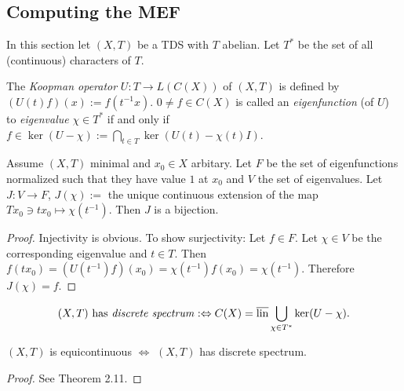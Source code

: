 \subsection{Computing the MEF}
In this section let $(X,T)$ be a TDS with $T$ abelian.
Let $T^*$ be the set of all (continuous) characters of $T$.
\begin{definition}
  The \emph{Koopman operator} $U : T \to L(C(X))$ of $(X,T)$ is defined by $(U(t) f)(x) := f(t^{-1}x)$.
  $0 \neq f \in C(X)$ is called an \emph{eigenfunction} (of $U$) to \emph{eigenvalue} $\chi \in T^*$ if and only if $f \in \ker (U-\chi):= \bigcap_{t \in T} \ker (U(t)- \chi (t)I)$.
\end{definition}
\begin{proposition}
  Assume $(X,T)$ minimal and $x_0 \in X$ arbitary. Let $F$ be the set of eigenfunctions normalized such that they have value $1$ at $x_0$ and $V$ the set of eigenvalues. Let $J: V \to F$, $J(\chi):=$ the unique continuous extension of the map $T x_0 \ni t x_0 \mapsto \chi(t^{-1})$. Then $J$ is a bijection.
\end{proposition}
\begin{proof}
  Injectivity is obvious.
  To show surjectivity:
  Let $f \in F$. Let $\chi \in V$ be the corresponding eigenvalue and $t \in T$. Then $ f(t x_0) = (U(t^{-1}) f)(x_0) = \chi(t^{-1}) f(x_0) = \chi (t^{-1})$. Therefore $J(\chi ) = f$.
\end{proof}
\begin{definition}
  \begin{equation*}
    (X,T) \ \text{has \emph{discrete spectrum}}:\Leftrightarrow C(X) = \overline{\operatorname{lin}} \bigcup_{\chi \in T^*} \ker (U- \chi).
  \end{equation*}
\end{definition}
\begin{theorem}
  \label{mef:thm:equiEQdiscrete}
  $(X,T)$ is equicontinuous $\Leftrightarrow$ $(X,T)$ has discrete spectrum.
\end{theorem}
\begin{proof}
  See \cite{HK2023} Theorem 2.11.
\end{proof}

